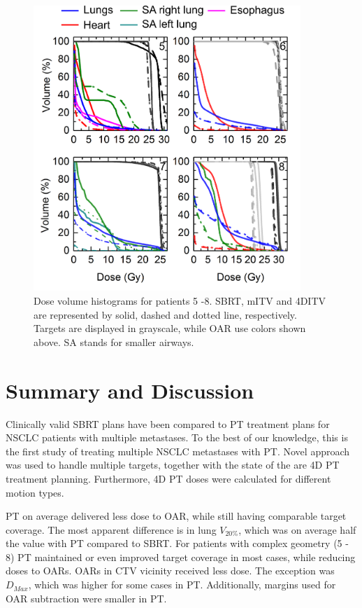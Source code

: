 \documentclass[type=dr, dr=rernat, accentcolor=tud7b,colorbacktitle, bigchapter, openright, twoside, 12pt ]{tudthesis}
\begin{document}
\newpage
\begin{figure}[H]
	\begin{center}
		\includegraphics[width=0.9\textwidth]{./Images/DVH_legend.png}
		\caption{Dose volume histograms for patients 5 -8. SBRT, mITV and 4DITV are represented by solid, dashed and dotted line, respectively. Targets are displayed
		in grayscale, while OAR use colors shown above. SA stands for smaller airways.}
		\label{Fig:dvh}
	\end{center}
\end{figure}
\newpage


\section{Summary and Discussion}

Clinically valid SBRT plans have been compared to PT treatment plans for NSCLC patients with multiple metastases. 
To the best of our knowledge, this is the first study of treating multiple NSCLC metastases with PT. Novel approach was used to handle multiple targets, together
with the state of the are 4D PT treatment planning. Furthermore, 4D PT doses were calculated for different motion types. 

PT on average delivered less dose to OAR, while still having comparable target coverage.
The most apparent difference is in lung $V_{20\%}$, which was on average half the value with PT compared to SBRT.
For patients with complex geometry (5 - 8) PT maintained or even improved target coverage in most cases, while reducing doses to OARs. OARs in CTV vicinity received less dose. The
exception was $D_{Max}$, which was higher for some cases in PT. Additionally, margins used for OAR subtraction were smaller in PT.
\end{document}
